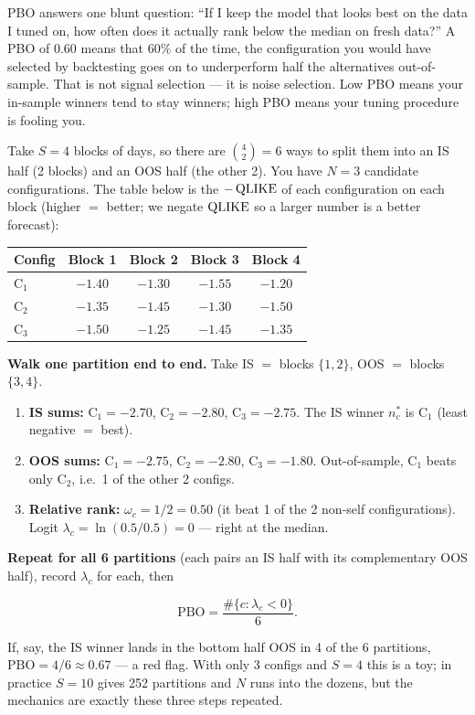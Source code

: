 \begin{intuition}
PBO answers one blunt question: ``If I keep the model that looks best on the data I tuned on, how often does it actually rank below the median on fresh data?''
A PBO of $0.60$ means that 60\% of the time, the configuration you would have selected by backtesting goes on to underperform half the alternatives out-of-sample.
That is not signal selection --- it is noise selection.
Low PBO means your in-sample winners tend to stay winners; high PBO means your tuning procedure is fooling you.
\end{intuition}

\begin{workedexample}[CSCV by Hand: $S=4$, Three Configurations]
Take $S = 4$ blocks of days, so there are $\binom{4}{2} = 6$ ways to split them into an IS half (2 blocks) and an OOS half (the other 2).
You have $N = 3$ candidate configurations.
The table below is the $-\operatorname{QLIKE}$ of each configuration on each block (higher $=$ better; we negate $\operatorname{QLIKE}$ so a larger number is a better forecast):

\medskip
\begin{center}
\begin{tabular}{lcccc}
\toprule
Config & Block 1 & Block 2 & Block 3 & Block 4 \\
\midrule
$\text{C}_1$ & $-1.40$ & $-1.30$ & $-1.55$ & $-1.20$ \\
$\text{C}_2$ & $-1.35$ & $-1.45$ & $-1.30$ & $-1.50$ \\
$\text{C}_3$ & $-1.50$ & $-1.25$ & $-1.45$ & $-1.35$ \\
\bottomrule
\end{tabular}
\end{center}
\medskip

\textbf{Walk one partition end to end.}
Take IS $=$ blocks $\{1,2\}$, OOS $=$ blocks $\{3,4\}$.
\begin{enumerate}[nosep]
  \item \textbf{IS sums:} $\text{C}_1 = -2.70$, $\text{C}_2 = -2.80$, $\text{C}_3 = -2.75$. The IS winner $n^*_c$ is $\text{C}_1$ (least negative $=$ best).
  \item \textbf{OOS sums:} $\text{C}_1 = -2.75$, $\text{C}_2 = -2.80$, $\text{C}_3 = -1.80$. Out-of-sample, $\text{C}_1$ beats only $\text{C}_2$, i.e.\ 1 of the other 2 configs.
  \item \textbf{Relative rank:} $\omega_c = 1/2 = 0.50$ (it beat 1 of the 2 non-self configurations). Logit $\lambda_c = \ln(0.5/0.5) = 0$ --- right at the median.
\end{enumerate}

\textbf{Repeat for all 6 partitions} (each pairs an IS half with its complementary OOS half), record $\lambda_c$ for each, then

\[
\text{PBO} = \frac{\#\{c : \lambda_c < 0\}}{6}.
\]

If, say, the IS winner lands in the bottom half OOS in 4 of the 6 partitions, $\text{PBO} = 4/6 \approx 0.67$ --- a red flag.
With only 3 configs and $S=4$ this is a toy; in practice $S = 10$ gives 252 partitions and $N$ runs into the dozens, but the mechanics are exactly these three steps repeated.
\end{workedexample}

